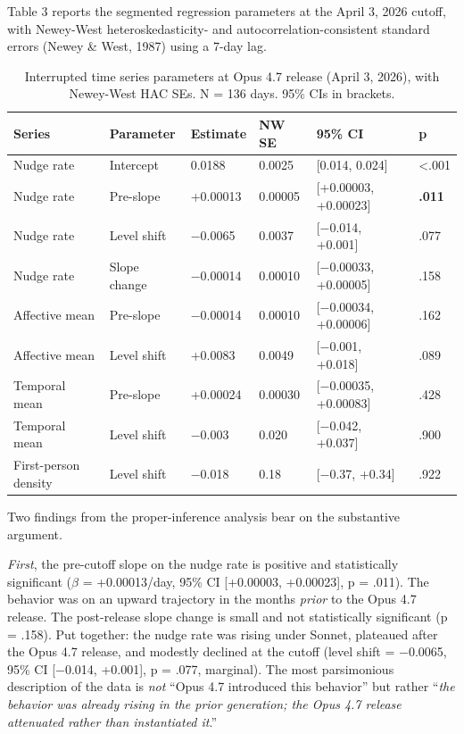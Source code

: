 \documentclass[11pt]{article}
\begin{document}
Table 3 reports the segmented regression parameters at the April 3, 2026 cutoff, with Newey-West heteroskedasticity- and autocorrelation-consistent standard errors (Newey \& West, 1987) using a 7-day lag.

\begin{table}[h]
\caption{Interrupted time series parameters at Opus 4.7 release (April 3, 2026), with Newey-West HAC SEs. N = 136 days. 95\% CIs in brackets.}
\centering
\begin{tabular}{llllll}
\toprule
Series & Parameter & Estimate & NW SE & 95\% CI & p \\
\midrule
Nudge rate & Intercept & 0.0188 & 0.0025 & [0.014, 0.024] & \textless{}.001 \\
Nudge rate & Pre-slope & +0.00013 & 0.00005 & [+0.00003, +0.00023] & \textbf{.011} \\
Nudge rate & Level shift & $-$0.0065 & 0.0037 & [$-$0.014, +0.001] & .077 \\
Nudge rate & Slope change & $-$0.00014 & 0.00010 & [$-$0.00033, +0.00005] & .158 \\
Affective mean & Pre-slope & $-$0.00014 & 0.00010 & [$-$0.00034, +0.00006] & .162 \\
Affective mean & Level shift & +0.0083 & 0.0049 & [$-$0.001, +0.018] & .089 \\
Temporal mean & Pre-slope & +0.00024 & 0.00030 & [$-$0.00035, +0.00083] & .428 \\
Temporal mean & Level shift & $-$0.003 & 0.020 & [$-$0.042, +0.037] & .900 \\
First-person density & Level shift & $-$0.018 & 0.18 & [$-$0.37, +0.34] & .922 \\
\bottomrule
\end{tabular}
\end{table}

Two findings from the proper-inference analysis bear on the substantive argument.

\emph{First}, the pre-cutoff slope on the nudge rate is positive and statistically significant ($\beta$ = +0.00013/day, 95\% CI [+0.00003, +0.00023], p = .011). The behavior was on an upward trajectory in the months \emph{prior} to the Opus 4.7 release. The post-release slope change is small and not statistically significant (p = .158). Put together: the nudge rate was rising under Sonnet, plateaued after the Opus 4.7 release, and modestly declined at the cutoff (level shift = $-$0.0065, 95\% CI [$-$0.014, +0.001], p = .077, marginal). The most parsimonious description of the data is \emph{not} ``Opus 4.7 introduced this behavior'' but rather ``\emph{the behavior was already rising in the prior generation; the Opus 4.7 release attenuated rather than instantiated it}.''
\end{document}
